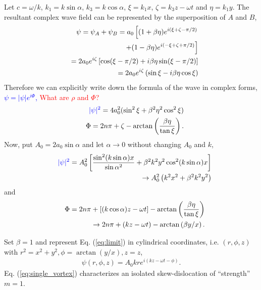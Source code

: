 Let $c = \omega/k$, $k_1 = k \sin \alpha$, $k_3 = k \cos \alpha$, $\xi = k_1 x$, $\zeta = k_3 z - \omega t$ and $\eta = k_1 y$. 
The resultant complex wave field can be represented by the superposition of $A$ and $B$,
\begin{eqnarray}
	&&\psi = \psi_A + \psi_B = a_0 \left[ ( 1 + \beta \eta ) e^{i(\xi + \zeta - \pi/2)} \right. 
	\nonumber\\
	&&\hspace{0.3in} \left. + ( 1 - \beta \eta ) e^{i (- \xi + \zeta + \pi/2)} \right]
	\nonumber\\
	&&= 2 a_0 e^{i\zeta} \left[ \cos(\xi - \pi/2) + i \beta \eta \sin(\xi - \pi/2) \right]
	\nonumber\\
	&&= 2 a_0 e^{i\zeta} \left( \sin \xi - i \beta \eta \cos\xi \right)
	\nonumber
\end{eqnarray}
Therefore we can explicitly write down the formula of the wave in complex forms, \textcolor{blue}{$\psi = |\psi| e^{i\Phi}$,}
\textcolor{red}{What are $\rho$ and $\Phi$?}
\begin{eqnarray}
	&&\textcolor{blue}{|\psi|^2} = 4a_0^2 (\sin^2 \xi + \beta^2 \eta^2 \cos^2 \xi)
	\nonumber\\
	&&\Phi = 2n\pi + \zeta - \arctan\left(\frac{\beta \eta}{\tan \xi} \right).
\end{eqnarray}
Now, put $A_0 = 2a_0 \sin\alpha$ and let $\alpha \rightarrow 0$ without changing $A_0$ and $k$,
\begin{eqnarray}
	&&\textcolor{blue}{|\psi|^2} = A_0^2 \left[ \frac{\sin^2 (k\sin\alpha)x}{\sin\alpha^2} + \beta^2 k^2 y^2 \cos^2(k\sin\alpha)x \right]
	\nonumber\\
	&& \hspace{0.15in} \rightarrow A_0^2\left( k^2 x^2 + \beta^2 k^2 y^2 \right)
\end{eqnarray}
and
\begin{eqnarray}
	&&\Phi = 2n\pi + \left[(k \cos\alpha) z - \omega t \right] - \arctan\left(\frac{\beta \eta}{\tan \xi} \right)
	\nonumber\\
	&& \hspace{0.15in} \rightarrow 2n\pi + (kz - \omega t) - \arctan\left(\beta y/ x\right).
	\label{eq:limit}
\end{eqnarray}

Set $\beta = 1$ and represent Eq. (\ref{eq:limit}) in cylindrical coordinates, i.e. $(r, \phi, z)$ with $r^2 = x^2 + y^2, \phi = \arctan(y/x), z = z$,
\begin{eqnarray}
	\psi(r, \phi, z) = A_0 kr e^{i(k z - \omega t - \phi)}.
	\label{eq:single_vortex}
\end{eqnarray}
Eq. (\ref{eq:single_vortex}) characterizes an isolated skew-dislocation \cite{Ber73} of ``strength'' $m = 1$.

